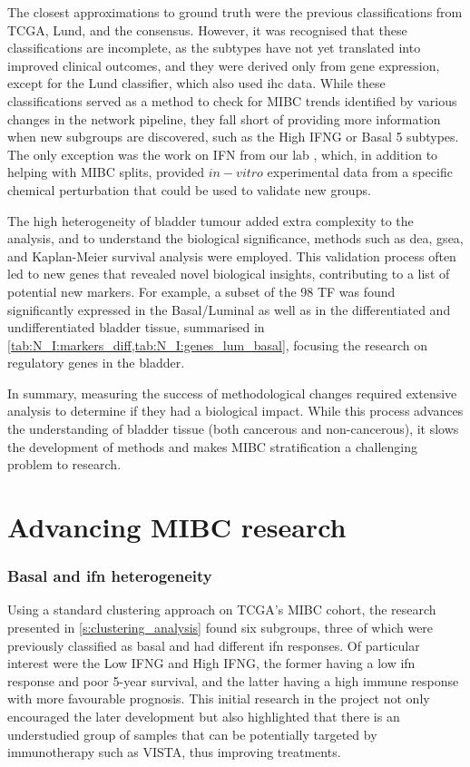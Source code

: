 The closest approximations to ground truth were the previous classifications from TCGA, Lund, and the consensus. However, it was recognised that these classifications are incomplete, as the subtypes have not yet translated into improved clinical outcomes, and they were derived only from gene expression, except for the Lund classifier, which also used \acrlong{ihc} data. While these classifications served as a method to check for MIBC trends identified by various changes in the network pipeline, they fall short of providing more information when new subgroups are discovered, such as the High IFNG or Basal 5 subtypes. The only exception was the work on \gls{IFN} from our lab \citep{Baker2022-bj}, which, in addition to helping with MIBC splits, provided
$in-vitro$ experimental data from a specific chemical perturbation that could be used to validate new groups.

The high heterogeneity of bladder tumour added extra complexity to the analysis, and to understand the biological significance, methods such as \acrlong{dea}, \acrlong{gsea}, and Kaplan-Meier survival analysis were employed. This validation process often led to new genes that revealed novel biological insights, contributing to a list of potential new markers. For example, a subset of the 98 TF was found significantly expressed in the Basal/Luminal as well as in the differentiated and undifferentiated bladder tissue, summarised in \cref{tab:N_I:markers_diff,tab:N_I:genes_lum_basal}, focusing the research on regulatory genes in the bladder.


In summary, measuring the success of methodological changes required extensive analysis to determine if they had a biological impact. While this process advances the understanding of bladder tissue (both cancerous and non-cancerous), it slows the development of methods and makes MIBC stratification a challenging problem to research.

\section{Advancing MIBC research}

\subsubsection*{Basal and \acrlong{ifn} heterogeneity}

Using a standard clustering approach on TCGA's MIBC cohort, the research presented in \cref{s:clustering_analysis} found six subgroups, three of which were previously classified as basal and had different \acrshort{ifn} responses. Of particular interest were the Low IFNG and High IFNG, the former having a low \acrshort{ifn} response and poor 5-year survival, and the latter having a high immune response with more favourable prognosis. This initial research in the project not only encouraged the later development but also highlighted that there is an understudied group of samples that can be potentially targeted by immunotherapy such as VISTA\citep{Baker2022-bj}, thus improving treatments.


